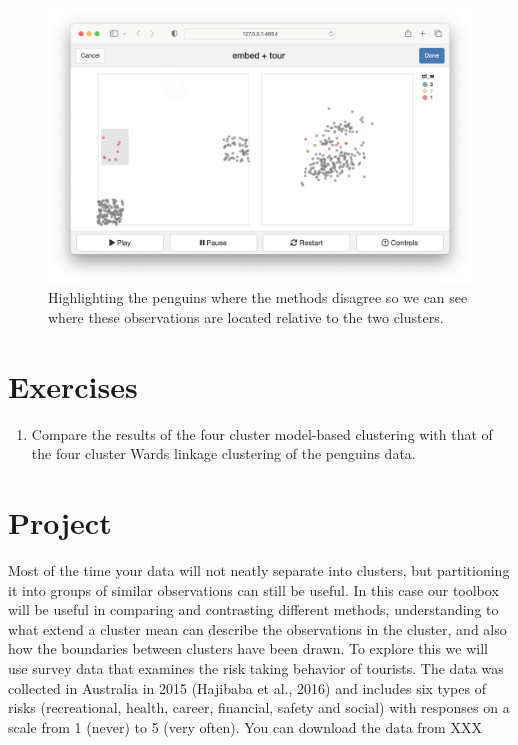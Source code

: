 \documentclass[
  letterpaper,
]{book}
\providecommand{\tightlist}{%
  \setlength{\itemsep}{0pt}\setlength{\parskip}{0pt}}\usepackage{longtable,booktabs,array}
\begin{document}
\begin{figure}

{\centering \includegraphics{./images/compare-clusters2.png}

}

\caption{\label{fig-compare-clusters2}Highlighting the penguins where
the methods disagree so we can see where these observations are located
relative to the two clusters.}

\end{figure}

\hypertarget{exercises-10}{%
\section*{Exercises}\label{exercises-10}}


\begin{enumerate}
\def\labelenumi{\arabic{enumi}.}
\tightlist
\item
  Compare the results of the four cluster model-based clustering with
  that of the four cluster Wards linkage clustering of the penguins
  data.
\end{enumerate}

\hypertarget{project-1}{%
\section*{Project}\label{project-1}}


Most of the time your data will not neatly separate into clusters, but
partitioning it into groups of similar observations can still be useful.
In this case our toolbox will be useful in comparing and contrasting
different methods, understanding to what extend a cluster mean can
describe the observations in the cluster, and also how the boundaries
between clusters have been drawn. To explore this we will use survey
data that examines the risk taking behavior of tourists. The data was
collected in Australia in 2015 (Hajibaba et al., 2016) and includes six
types of risks (recreational, health, career, financial, safety and
social) with responses on a scale from 1 (never) to 5 (very often). You
can download the data from XXX
\end{document}
